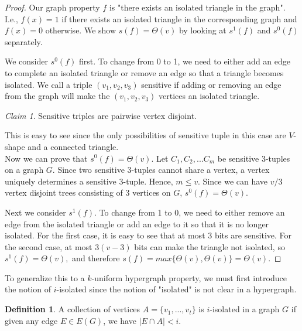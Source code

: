 \documentclass[psamsfonts]{amsart}
\theoremstyle{definition}
\newtheorem{defn}[theorem]{Definition}
\theoremstyle{remark}
\newtheorem{claim}[theorem]{Claim}
\numberwithin{equation}{section}
\begin{document}
	\begin{proof}
		Our graph property $f$ is "there exists an isolated triangle in the graph". I.e., $f(x) = 1$ if there exists an isolated triangle in the corresponding graph and $f(x)=0$ otherwise. We show $s(f) = \Theta(v)$ by looking at $s^1(f)$ and $s^0(f)$ separately.

		We consider $s^0(f)$ first. To change from 0 to 1, we need to either add an edge to complete an isolated triangle or remove an edge so that a triangle becomes isolated. We call a triple $(v_1,v_2,v_3)$ sensitive if adding or removing an edge from the graph will make the $(v_1,v_2,v_3)$ vertices an isolated triangle.

	\begin{claim}
		Sensitive triples are pairwise vertex disjoint. 
	\end{claim}
	This is easy to see since the only possibilities of sensitive tuple in this case are $V$-shape and a connected triangle.\\

	\indent Now we can prove that $s^0(f) = \Theta(v)$. Let $C_1, C_2, ... C_m$ be sensitive 3-tuples on a graph $G$. Since two sensitive 3-tuples cannot share a vertex, a vertex uniquely determines a sensitive 3-tuple. Hence, $m \leq v$. Since we can have $v/3$ vertex disjoint trees consisting of 3 vertices on $G$, $s^0(f) = \Theta(v)$.

	Next we consider $s^1(f)$. To change from 1 to 0, we need to either remove an edge from the isolated triangle or add an edge to it so that it is no longer isolated. For the first case, it is easy to see that at most 3 bits are sensitive. For the second case, at most $3(v-3)$ bits can make the triangle not isolated, so $s^1(f) = \Theta(v),$ and therefore $s(f) = max\{\Theta(v),\Theta(v)\}=\Theta(v)$.
	\end{proof}
	To generalize this to a $k$-uniform hypergraph property, we must first introduce the notion of $i$-isolated since the notion of "isolated" is not clear in a hypergraph.
	\begin{defn}
		A collection of vertices $A = \{v_1,...,v_t\}$ is $i$-isolated in a graph $G$ if given any edge $E \in E(G)$, we have $|E \cap A| < i$.
	\end{defn}
	
\end{document}
